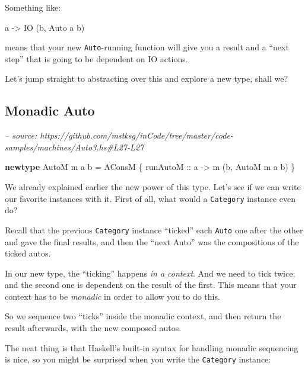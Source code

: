 \documentclass[]{article}
\newenvironment{Shaded}{}{}
\newcommand{\CommentTok}[1]{\textcolor[rgb]{0.38,0.63,0.69}{\textit{#1}}}
\newcommand{\DataTypeTok}[1]{\textcolor[rgb]{0.56,0.13,0.00}{#1}}
\newcommand{\FunctionTok}[1]{\textcolor[rgb]{0.02,0.16,0.49}{#1}}
\newcommand{\KeywordTok}[1]{\textcolor[rgb]{0.00,0.44,0.13}{\textbf{#1}}}
\newcommand{\NormalTok}[1]{#1}
\newcommand{\OtherTok}[1]{\textcolor[rgb]{0.00,0.44,0.13}{#1}}
\begin{document}
Something like:

\begin{Shaded}
\begin{Highlighting}[]
\NormalTok{a }\OtherTok{->} \DataTypeTok{IO}\NormalTok{ (b, }\DataTypeTok{Auto}\NormalTok{ a b)}
\end{Highlighting}
\end{Shaded}

means that your new \texttt{Auto}-running function will give you a result and a
``next step'' that is going to be dependent on IO actions.

Let's jump straight to abstracting over this and explore a new type, shall we?

\hypertarget{monadic-auto}{%
\subsection{Monadic Auto}\label{monadic-auto}}

\begin{Shaded}
\begin{Highlighting}[]
\CommentTok{-- source: https://github.com/mstksg/inCode/tree/master/code-samples/machines/Auto3.hs#L27-L27}

\KeywordTok{newtype} \DataTypeTok{AutoM}\NormalTok{ m a b }\FunctionTok{=} \DataTypeTok{AConsM}\NormalTok{ \{}\OtherTok{ runAutoM ::}\NormalTok{ a }\OtherTok{->}\NormalTok{ m (b, }\DataTypeTok{AutoM}\NormalTok{ m a b) \}}
\end{Highlighting}
\end{Shaded}

We already explained earlier the new power of this type. Let's see if we can
write our favorite instances with it. First of all, what would a
\texttt{Category} instance even do?

Recall that the previous \texttt{Category} instance ``ticked'' each
\texttt{Auto} one after the other and gave the final results, and then the
``next Auto'' was the compositions of the ticked autos.

In our new type, the ``ticking'' happens \emph{in a context}. And we need to
tick twice; and the second one is dependent on the result of the first. This
means that your context has to be \emph{monadic} in order to allow you to do
this.

So we sequence two ``ticks'' inside the monadic context, and then return the
result afterwards, with the new composed autos.

The neat thing is that Haskell's built-in syntax for handling monadic sequencing
is nice, so you might be surprised when you write the \texttt{Category}
instance:
\end{document}
